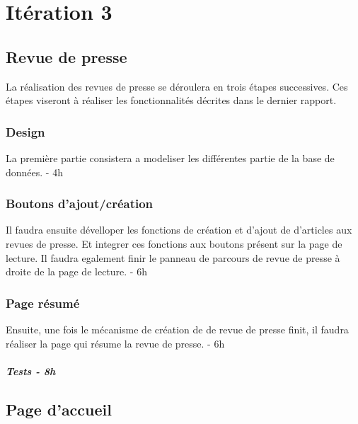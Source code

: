 \section{Itération 3}

	\subsection{Revue de presse}
	\label{sec:revue}

		La réalisation des revues de presse se déroulera en trois étapes successives.
		Ces étapes viseront à réaliser les fonctionnalités décrites dans le dernier rapport.

		\subsubsection{Design}
		\label{subpar:revue_design}
			La première partie consistera a modeliser les différentes partie de la base de données. - 4h

		\subsubsection{Boutons d'ajout/création}
		\label{subpar:revue_design}
			Il faudra ensuite dévelloper les fonctions de création et d'ajout de d'articles aux revues de presse.
			Et integrer ces fonctions aux boutons présent sur la page de lecture.
			Il faudra egalement finir le panneau de parcours de revue de presse à droite de la page de lecture. - 6h

		\subsubsection{Page résumé}
		\label{subpar:revue_resume}
			Ensuite, une fois le mécanisme de création de de revue de presse finit, il faudra réaliser la page qui résume
			la revue de presse. - 6h

		\subparagraph{Tests - 8h}
		\label{subpar:revue_tests}

	\subsection{Page d'accueil}

